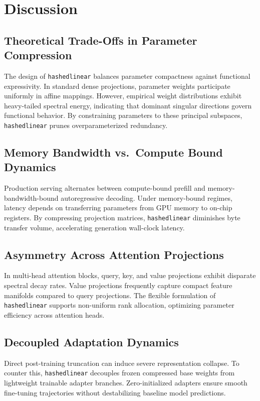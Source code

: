 \section{Discussion}

\subsection{Theoretical Trade-Offs in Parameter Compression}
The design of \texttt{hashedlinear} balances parameter compactness against functional expressivity. In standard dense projections, parameter weights participate uniformly in affine mappings. However, empirical weight distributions exhibit heavy-tailed spectral energy, indicating that dominant singular directions govern functional behavior. By constraining parameters to these principal subspaces, \texttt{hashedlinear} prunes overparameterized redundancy.

\subsection{Memory Bandwidth vs.\ Compute Bound Dynamics}
Production serving alternates between compute-bound prefill and memory-bandwidth-bound autoregressive decoding. Under memory-bound regimes, latency depends on transferring parameters from GPU memory to on-chip registers. By compressing projection matrices, \texttt{hashedlinear} diminishes byte transfer volume, accelerating generation wall-clock latency.

\subsection{Asymmetry Across Attention Projections}
In multi-head attention blocks, query, key, and value projections exhibit disparate spectral decay rates. Value projections frequently capture compact feature manifolds compared to query projections. The flexible formulation of \texttt{hashedlinear} supports non-uniform rank allocation, optimizing parameter efficiency across attention heads.

\subsection{Decoupled Adaptation Dynamics}
Direct post-training truncation can induce severe representation collapse. To counter this, \texttt{hashedlinear} decouples frozen compressed base weights from lightweight trainable adapter branches. Zero-initialized adapters ensure smooth fine-tuning trajectories without destabilizing baseline model predictions.


